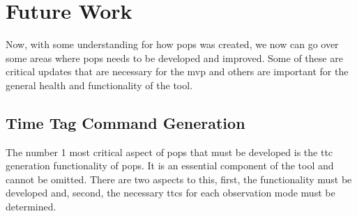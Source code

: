 


\section{Future Work}

Now, with some understanding for how \gls{pops} was created, we now can go over
some areas where \gls{pops} needs to be developed and improved. Some of these
are critical updates that are necessary for the \gls{mvp} and others are
important for the general health and functionality of the tool.

\subsection{Time Tag Command Generation}

The number 1 most critical aspect of \gls{pops} that must be developed is the
\gls{ttc} generation functionality of \gls{pops}. It is an essential component
of the tool and cannot be omitted. There are two aspects to this, first, the
functionality must be developed and, second, the necessary \glspl{ttc} for each
observation mode must be determined.

